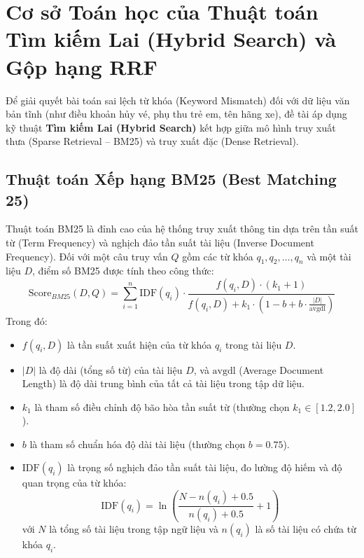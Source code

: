 \section{Cơ sở Toán học của Thuật toán Tìm kiếm Lai (Hybrid Search) và Gộp hạng RRF}

Để giải quyết bài toán sai lệch từ khóa (Keyword Mismatch) đối với dữ liệu văn bản tĩnh (như điều khoản hủy vé, phụ thu trẻ em, tên hãng xe), đề tài áp dụng kỹ thuật \textbf{Tìm kiếm Lai (Hybrid Search)} kết hợp giữa mô hình truy xuất thưa (Sparse Retrieval -- BM25) và truy xuất đặc (Dense Retrieval).

\subsection{Thuật toán Xếp hạng BM25 (Best Matching 25)}
Thuật toán BM25 là đỉnh cao của hệ thống truy xuất thông tin dựa trên tần suất từ (Term Frequency) và nghịch đảo tần suất tài liệu (Inverse Document Frequency). Đối với một câu truy vấn $Q$ gồm các từ khóa $q_1, q_2, \dots, q_n$ và một tài liệu $D$, điểm số BM25 được tính theo công thức:
\begin{equation}
    \text{Score}_{BM25}(D, Q) = \sum_{i=1}^{n} \text{IDF}(q_i) \cdot \frac{f(q_i, D) \cdot (k_1 + 1)}{f(q_i, D) + k_1 \cdot \left(1 - b + b \cdot \frac{|D|}{\text{avgdl}}\right)}
\end{equation}
Trong đó:
\begin{itemize}
    \item $f(q_i, D)$ là tần suất xuất hiện của từ khóa $q_i$ trong tài liệu $D$.
    \item $|D|$ là độ dài (tổng số từ) của tài liệu $D$, và $\text{avgdl}$ (Average Document Length) là độ dài trung bình của tất cả tài liệu trong tập dữ liệu.
    \item $k_1$ là tham số điều chỉnh độ bão hòa tần suất từ (thường chọn $k_1 \in [1.2, 2.0]$).
    \item $b$ là tham số chuẩn hóa độ dài tài liệu (thường chọn $b = 0.75$).
    \item $\text{IDF}(q_i)$ là trọng số nghịch đảo tần suất tài liệu, đo lường độ hiếm và độ quan trọng của từ khóa:
    \begin{equation}
        \text{IDF}(q_i) = \ln \left( \frac{N - n(q_i) + 0.5}{n(q_i) + 0.5} + 1 \right)
    \end{equation}
    với $N$ là tổng số tài liệu trong tập ngữ liệu và $n(q_i)$ là số tài liệu có chứa từ khóa $q_i$.
\end{itemize}

